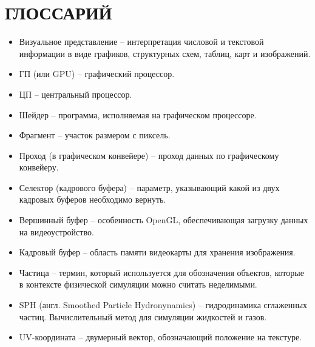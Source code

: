 \newpage
\section{ГЛОССАРИЙ}

\begin{itemize}
  \item Визуальное представление -- интерпретация числовой и текстовой информации в 
    виде графиков, структурных схем, таблиц, карт и изображений.
  \item ГП (или GPU) -- графический процессор.
  \item ЦП -- центральный процессор.
  \item Шейдер -- программа, исполняемая на графическом процессоре.
  \item Фрагмент -- участок размером с пиксель.
  \item Проход (в графическом конвейере) -- проход данных по графическому конвейеру.
  \item Селектор (кадрового буфера) -- параметр, указывающий какой из двух кадровых буферов
    необходимо вернуть.
  \item Вершинный буфер -- особенность OpenGL, обеспечивающая загрузку данных на видеоустройство.
  \item Кадровый буфер -- область памяти видеокарты для хранения изображения.
  \item Частица -- термин, который используется для обозначения объектов, которые в 
    контексте физической симуляции можно считать неделимыми.
  \item SPH (англ. Smoothed Particle Hydronynamics) -- гидродинамика сглаженных частиц. 
    Вычислительный метод для симуляции жидкостей и газов.
  \item UV-координата -- двумерный вектор, обозначающий положение на текстуре.
\end{itemize}
